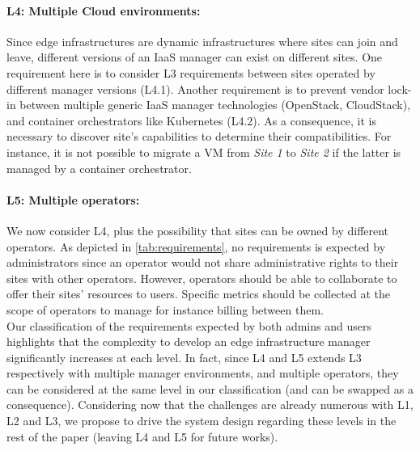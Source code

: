 \paragraph{L4: Multiple Cloud environments:}
Since edge infrastructures are dynamic infrastructures where sites can join and
leave, different versions of an IaaS manager can exist on different sites. One
requirement here is to consider L3 requirements between sites operated by
different manager versions (L4.1). Another requirement is to prevent vendor
lock-in between multiple generic IaaS manager technologies (\eg OpenStack,
CloudStack), and container orchestrators like Kubernetes (L4.2).
As a consequence, it is necessary to discover site's capabilities to determine
their compatibilities. For instance, it is not possible to migrate a VM from
\emph{Site 1} to \emph{Site 2} if the latter is managed by a container
orchestrator.

\paragraph{L5: Multiple operators:}
We now consider L4, plus the possibility that sites can be owned by different
operators. As depicted in \cref{tab:requirements}, no requirements is expected
by administrators since an operator would not share administrative rights to
their sites with other operators. However,
operators should be able to collaborate to offer their sites' resources to
users. Specific metrics should be collected at the scope of operators to
manage for instance billing between them.\\

Our classification of the requirements expected by both admins and users
highlights that the complexity to develop an edge infrastructure manager
significantly increases at each level. In fact, since L4 and L5 extends L3
respectively with multiple manager environments, and multiple operators, they
can be considered at the same level in our classification (and can be swapped
as a consequence).
Considering now that the challenges are already numerous with L1, L2 and L3, we
propose to drive the system design regarding these levels in the rest of the
paper (leaving L4 and L5 for future works).

